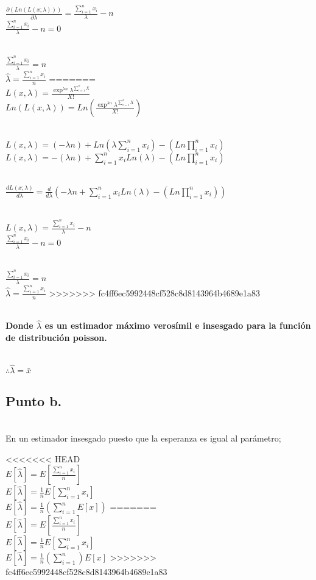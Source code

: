 \documentclass[letterpaper,12pt,onecolumn,titlepage]{article}
\begin{document}
~\\ $\frac{\partial(Ln(L(x;\lambda)))}{\partial\lambda} = \frac{\sum\limits_{i=1}^n{x_{i}}}{\lambda} - n $
~\\ $\frac{\sum\limits_{i=1}^n{x_{i}}}{\lambda} - n = 0$

~\\ $\frac{\sum\limits_{i=1}^n{x_{i}}}{\lambda} = n $
~\\ $\hat{\lambda} = \frac{\sum\limits_{i=1}^n{x_{i}}}{n}$
=======
~\\ $L(x,\lambda) = \frac{\exp^{\lambda n}\lambda^{\sum_{i=1}^n{X}}}{X!}$
~\\ $Ln(L(x,\lambda)) = Ln(\frac{\exp^{\lambda n}\lambda^{\sum_{i=1}^n{X}}}{X!})$

~\\ $L(x,\lambda) = (-\lambda n) + Ln(\lambda{\sum_{i=1}^n{x_{i}}}) - (Ln\prod_{i=1}^n{x_{i}})$
~\\ $L(x,\lambda) = -(\lambda n) + {\sum_{i=1}^n{x_{i}}}Ln(\lambda) - (Ln\prod_{i=1}^n{x_{i}})$

~\\ $\frac{dL(x;\lambda)}{d\lambda} = \frac{d}{d\lambda}(-\lambda n + {\sum_{i=1}^n{x_{i}}}Ln(\lambda) - (Ln\prod_{i=1}^n{x_{i}}))$

~\\ $L(x,\lambda) = \frac{\sum_{i=1}^n{x_{i}}}{\lambda} - n $
~\\ $\frac{\sum_{i=1}^n{x_{i}}}{\lambda} - n = 0$

~\\ $\frac{\sum_{i=1}^n{x_{i}}}{\lambda} = n $
~\\ $\hat{\lambda} = \frac{\sum_{i=1}^n{x_{i}}}{n}$
>>>>>>> fc4ff6ec5992448cf528c8d8143964b4689e1a83

~\\ \textbf{Donde $\hat{\lambda}$ es un estimador m\'{a}ximo veros\'{i}mil e insesgado para la funci\'{o}n de distribuci\'{o}n poisson.} 
 
~\\ $\therefore \hat{\lambda} = \bar{x}$

\subsection{Punto b.}
~\\ En un estimador insesgado puesto que la esperanza es igual al par\'{a}metro;

<<<<<<< HEAD
~\\ $E[\hat{\lambda}] = E[\frac{\sum\limits_{i=1}^n{x_{i}}}{n}]$
~\\ $E[\hat{\lambda}] = \frac{1}{n}E[\sum\limits_{i=1}^n{x_{i}}]$
~\\ $E[\hat{\lambda}] = \frac{1}{n}(\sum\limits_{i=1}^{n} E[x])$
=======
~\\ $E[\hat{\lambda}] = E[\frac{\sum_{i=1}^n{x_{i}}}{n}]$
~\\ $E[\hat{\lambda}] = \frac{1}{n}E[\sum_{i=1}^n{x_{i}}]$
~\\ $E[\hat{\lambda}] = \frac{1}{n}(\sum_{i=1}^n)E[x]$
>>>>>>> fc4ff6ec5992448cf528c8d8143964b4689e1a83
\end{document}
